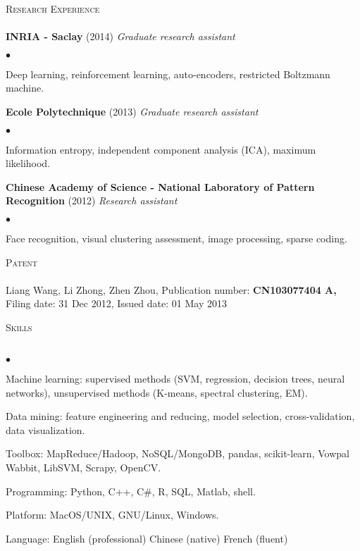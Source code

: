 \documentclass{article}
\newcommand{\lineunder}{\vspace*{-8pt} \\ \hspace*{-18pt} \hrulefill \\}
\newcommand{\header}[1]{{\hspace*{-15pt}\vspace*{6pt} \textsc{#1}} \vspace*{-6pt} \lineunder}
\newcommand{\employer}[3]{{ \textbf{#1} (#2) \hfill {\emph{#3}} \\  }}
\newcommand{\patent}[3]{{ #1 #2 \\ #3\\  }}
\newenvironment{achievements}{\begin{list}{$\bullet$}{\topsep 0pt \itemsep -2pt}}{\vspace*{4pt}\end{list}}
\begin{document}
	


\header{Research Experience}
\employer{INRIA - Saclay}{2014}{Graduate research assistant}
	\begin{achievements}
	\item Deep learning, reinforcement learning, auto-encoders, restricted Boltzmann machine.
	\end{achievements}

\employer{Ecole Polytechnique}{2013}{Graduate research assistant}
	\begin{achievements}
	\item Information entropy, independent component analysis (ICA), maximum likelihood.
	\end{achievements}


\employer{Chinese Academy of Science - National Laboratory of Pattern Recognition}{2012}{Research assistant}
	\begin{achievements}
	\item Face recognition, visual clustering assessment, image processing, sparse coding.
	\end{achievements}

\header{Patent}
\patent{Liang Wang, Li Zhong, Zhen Zhou,}{Publication number: \textbf{CN103077404 A,}} {Filing date: 31 Dec 2012, Issued date: 01 May 2013}

\header{Skills}
\begin{achievements}
\item Machine learning: supervised methods (SVM, regression, decision trees, neural networks), unsupervised methods (K-means, spectral clustering, EM).
\item Data mining: feature engineering and reducing, model selection, cross-validation, data visualization.
\item Toolbox: MapReduce/Hadoop, NoSQL/MongoDB, pandas, scikit-learn, Vowpal Wabbit, LibSVM, Scrapy, OpenCV.
\item Programming: Python, C++, C\#, R, SQL, Matlab, shell.
\item Platform: MacOS/UNIX, GNU/Linux, Windows.
\item Language: English (professional) \hspace*{16pt} Chinese (native) \hspace*{16pt} French (fluent)
\end{achievements}
\end{document}
